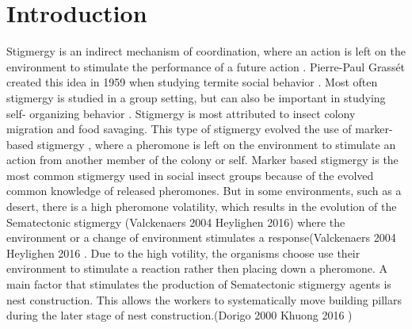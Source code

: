 \section{Introduction}

Stigmergy is an indirect mechanism of coordination, where an action is left on the environment to stimulate the performance of a future action \cite{susi_social_2001, ahadeli_multi-agent_2004}.
Pierre-Paul Grassét created this idea in 1959 when studying termite social behavior \cite{heylighen_stigmergy_2016a}.
Most often stigmergy is studied in a group setting, but can also be important in studying self- organizing behavior \cite{heylighen_stigmergy_2016b}.
Stigmergy is most attributed to insect colony migration and food savaging.
This type of stigmergy evolved the use of marker-based stigmergy \cite{ahadeli_multi-agent_2004, heylighen_stigmergy_2016b}, where a pheromone is left on the environment to stimulate an action from another member of the colony or self.
Marker based stigmergy is the most common stigmergy used in social insect groups because of the evolved common knowledge of released pheromones.
 But in some environments, such as a desert, there is a high pheromone volatility, which results in the evolution of the Sematectonic stigmergy (Valckenaers 2004 Heylighen 2016) where the environment or a change of environment stimulates a response(Valckenaers 2004 Heylighen 2016 . Due to the high votility, the organisms choose use their environment to stimulate a reaction rather then placing down a pheromone. A main factor that stimulates the production of Sematectonic stigmergy agents is nest construction. This allows the workers to systematically move building pillars during the later stage of nest construction.(Dorigo 2000 Khuong 2016 ) 

